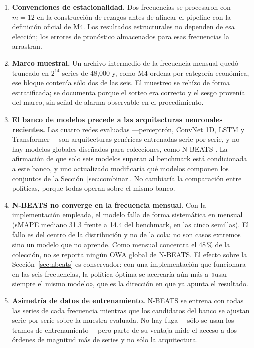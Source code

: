 \begin{enumerate}
\item \textbf{Convenciones de estacionalidad.} Dos frecuencias se procesaron con $m=12$
      en la construcción de rezagos antes de alinear el pipeline con la definición
      oficial de M4. Los resultados estructurales no dependen de esa elección; los
      errores de pronóstico almacenados para esas frecuencias la arrastran.

\item \textbf{Marco muestral.} Un archivo intermedio de la frecuencia mensual quedó
      truncado en $2^{14}$ series de 48{,}000 y, como M4 ordena por categoría económica,
      ese bloque contenía sólo dos de las seis. El muestreo se rehízo de forma
      estratificada; se documenta porque el sorteo era correcto y el sesgo provenía del
      marco, sin señal de alarma observable en el procedimiento.

\item \textbf{El banco de modelos precede a las arquitecturas neuronales
      recientes.} Las cuatro redes evaluadas ---perceptrón, ConvNet 1D, LSTM y
      Transformer--- son arquitecturas genéricas entrenadas serie por serie, y no hay
      modelos globales diseñados para colecciones, como N-BEATS \cite{oreshkin2020}. La
      afirmación de que solo seis modelos superan al benchmark está condicionada a este
      banco, y uno actualizado modificaría qué modelos componen los conjuntos de la
      Sección~\ref{sec:combinar}. No cambiaría la comparación entre políticas, porque
      todas operan sobre el mismo banco.

\item \textbf{N-BEATS no converge en la frecuencia mensual.} Con la implementación
      empleada, el modelo falla de forma sistemática en mensual (sMAPE mediano 31.3
      frente a 14.4 del benchmark, en las cinco semillas). El fallo es del centro de la
      distribución y no de la cola: no son casos extremos sino un modelo que no aprende.
      Como mensual concentra el 48\,\% de la colección, no se reporta ningún OWA global
      de N-BEATS. El efecto sobre la Sección~\ref{sec:nbeats} es conservador: con una
      implementación que funcionara en las seis frecuencias, la política óptima se
      acercaría aún más a «usar siempre el mismo modelo», que es la dirección en que ya
      apunta el resultado.

\item \textbf{Asimetría de datos de entrenamiento.} N-BEATS se entrena con todas las
      series de cada frecuencia mientras que los candidatos del banco se ajustan serie
      por serie sobre la muestra evaluada. No hay fuga ---sólo se usan los tramos de
      entrenamiento--- pero parte de su ventaja mide el acceso a dos órdenes de magnitud
      más de series y no sólo la arquitectura.


\end{enumerate}
